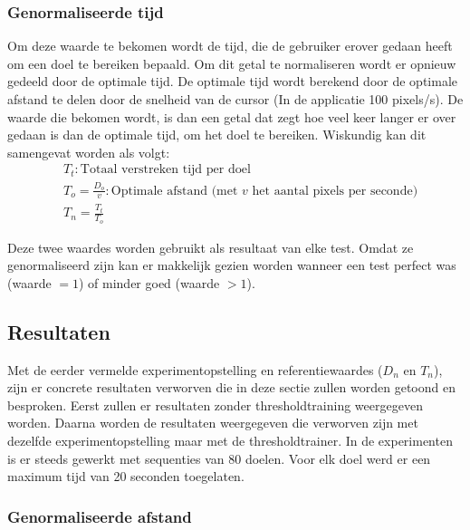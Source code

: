\documentclass{article}
\begin{document}
\subsubsection*{Genormaliseerde tijd}
Om deze waarde te bekomen wordt de tijd, die de gebruiker erover gedaan heeft om een doel te bereiken bepaald. Om dit getal te normaliseren wordt er opnieuw gedeeld door de optimale tijd. De optimale tijd wordt berekend door de optimale afstand te delen door de snelheid van de cursor (In de applicatie 100 pixels/s). De waarde die bekomen wordt, is dan een getal dat zegt hoe veel keer langer er over gedaan is dan de optimale tijd, om het doel te bereiken. Wiskundig kan dit samengevat worden als volgt:
\begin{align*}
	&T_t: \text{Totaal verstreken tijd per doel}\\
	&T_o = \frac{D_o}{v}: \text{Optimale afstand (met } v \text{ het aantal pixels per seconde)}\\
	&T_n = \frac{T_t}{T_o}
\end{align*} 

Deze twee waardes worden gebruikt als resultaat van elke test. Omdat ze genormaliseerd zijn kan er makkelijk gezien worden wanneer een test perfect was (waarde $= 1$) of minder goed (waarde $> 1$).

\subsection{Resultaten}
Met de eerder vermelde experimentopstelling en referentiewaardes ($D_n$ en $T_n$), zijn er concrete resultaten verworven die in deze sectie zullen worden getoond en besproken. Eerst zullen er resultaten zonder thresholdtraining weergegeven worden. Daarna worden de resultaten weergegeven die verworven zijn met dezelfde experimentopstelling maar met de thresholdtrainer. In de experimenten is er steeds gewerkt met sequenties van 80 doelen. Voor elk doel werd er een maximum tijd van 20 seconden toegelaten.
\subsubsection*{Genormaliseerde afstand}
\end{document}
